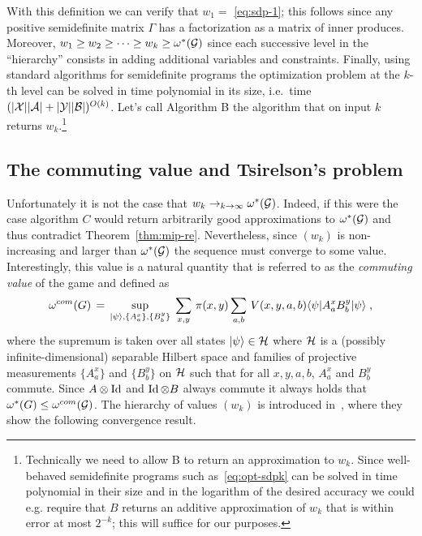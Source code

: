 With this definition we can verify that $w_1 =$ \eqref{eq:sdp-1}; this follows since any positive semidefinite matrix $\Gamma$ has a factorization as a matrix of inner produces. Moreover, $w_1 \geq w_2 \geq \cdots \geq w_k \geq \omega^*(\mathcal{G})$ since each successive level in the ``hierarchy'' consists in adding additional variables and constraints. Finally, using standard algorithms for semidefinite programs the optimization problem at the $k$-th level can be solved in time polynomial in its size, i.e.\ time $(|\mathcal{X}||\mathcal{A}|+|\mathcal{Y}||\mathcal{B}|)^{O(k)}$.
 Let's call Algorithm B the algorithm that on input $k$ returns $w_k$.\footnote{Technically we need to allow B to return an approximation to $w_k$. Since well-behaved semidefinite programs such as~\eqref{eq:opt-sdpk} can be solved in time polynomial in their size and in the logarithm of the desired accuracy we could e.g. require that $B$ returns an additive approximation of $w_k$ that is within error at most $2^{-k}$; this will suffice for our purposes.} 

\subsection{The commuting value and Tsirelson's problem}

Unfortunately it is not the case that $w_k\to_{k\to\infty} \omega^*(\mathcal{G})$. Indeed, if this were the case algorithm $C$ would return arbitrarily good approximations to $\omega^*(\mathcal{G})$ and thus contradict Theorem~\ref{thm:mip-re}. Nevertheless, since $(w_k)$ is non-increasing and larger than $\omega^*(\mathcal{G})$ the sequence must converge to some value.  Interestingly, this value is a natural quantity that is referred to as the \emph{commuting value} of the game and defined as
\begin{equation}\label{eq:val-com}
\omega^{com}(G) \,=\, \sup_{|\psi\rangle, \{A^x_a\},\{B^y_b\}} \; \sum_{x,y} \,\pi(x,y) \sum_{a,b} \,V(x,y,a,b) \langle\psi| A^x_a  B^y_b |\psi\rangle\;,
\end{equation}
where the supremum is taken over all states $|\psi\rangle \in \mathcal{H}$ where $\mathcal{H}$ is a (possibly infinite-dimensional) separable Hilbert space and families of projective measurements $\{ A^x_a\}$ and $\{  B^y_b \}$ on $\mathcal{H}$ such that for all $x,y,a,b$, $A^x_a$ and $B^y_b$ commute. Since $A \otimes \mathop{\rm Id}\nolimits$ and $\mathop{\rm Id}\nolimits \otimes B$ always commute it always holds that $\omega^*(G) \leq \omega^{com}(\mathcal{G})$. The hierarchy of values $(w_k)$ is introduced in~\cite{navascues2008convergent}, where they show the following convergence result. 

